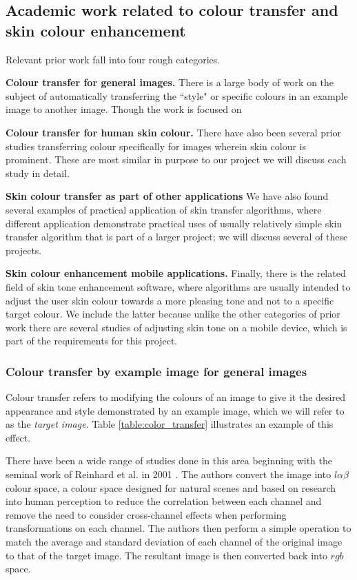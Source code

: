 

\subsection{Academic work related to colour transfer and skin colour enhancement}

Relevant prior work fall into four rough categories. 

\textbf{Colour transfer for general images.} There is a large body of work on the subject of automatically transferring the ``style" or specific colours in an example image to another image. Though the work is focused on 

\textbf{Colour transfer for human skin colour.} There have also been several prior studies transferring colour specifically for images wherein skin colour is prominent. These are most similar in purpose to our project we will discuss each study in detail.

\textbf{Skin colour transfer as part of other applications} We have also found several examples of practical application of skin transfer algorithms, where different application demonstrate practical uses of usually relatively simple skin transfer algorithm that is part of a larger project; we will discuss several of these projects. 

\textbf{Skin colour enhancement mobile applications.} Finally, there is the related field of skin tone enhancement software, where algorithms are usually intended to adjust the user skin colour towards a more pleasing tone and not to a specific target colour. We include the latter because unlike the other categories of prior work there are several studies of adjusting skin tone on a mobile device, which is part of the requirements for this project.

\subsubsection{Colour transfer by example image for general images}
Colour transfer refers to modifying the colours of an image to give it the desired appearance and style demonstrated by an example image, which we will refer to as the \textit{target image}. Table \ref{table:color_transfer} illustrates an example of this effect.

There have been a wide range of studies done in this area beginning with the seminal work of Reinhard et al. in 2001 \cite{reinhard_2001_transfer}. The authors convert the image into $l\alpha\beta$ colour space, a colour space designed for natural scenes and based on research into human perception to reduce the correlation between each channel and remove the need to consider cross-channel effects when performing transformations on each channel. The authors then perform a simple operation to match the average and standard deviation of each channel of the original image to that of the target image. The resultant image is then converted back into $rgb$ space.

